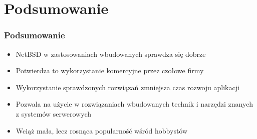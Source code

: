 \documentclass[dvipsnames,table]{beamer}
\begin{document}
\section{Podsumowanie}

\begin{frame}
\frametitle{Podsumowanie}
\begin{itemize}
	\item NetBSD w zastosowaniach wbudowanych sprawdza się dobrze
	\item Potwierdza to wykorzystanie komercyjne przez czołowe firmy
	\item Wykorzystanie sprawdzonych rozwiązań zmniejsza czas rozwoju aplikacji
	\item Pozwala na użycie w rozwiązaniach wbudowanych technik i narzędzi znanych z systemów serwerowych
	\item Wciąż mała, lecz rosnąca popularność wśród hobbystów
	\end{itemize}
\end{frame}
\end{document}
